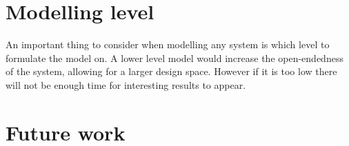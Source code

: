 \section{Modelling level}
An important thing to consider when modelling any system is which level to formulate the model on. A lower level model would increase the open-endedness of the system, allowing for a larger design space. However if it is too low there will not be enough time for interesting results to appear.

\section{Future work} %

